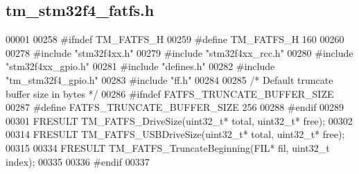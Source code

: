 \hypertarget{tm__stm32f4__fatfs_8h_source}{}\subsection{tm\+\_\+stm32f4\+\_\+fatfs.\+h}

\begin{DoxyCode}
00001 
00258 \textcolor{preprocessor}{#ifndef TM\_FATFS\_H}
00259 \textcolor{preprocessor}{#define TM\_FATFS\_H  160}
00260 
00278 \textcolor{preprocessor}{#include "stm32f4xx.h"}
00279 \textcolor{preprocessor}{#include "stm32f4xx\_rcc.h"}
00280 \textcolor{preprocessor}{#include "stm32f4xx\_gpio.h"}
00281 \textcolor{preprocessor}{#include "defines.h"}
00282 \textcolor{preprocessor}{#include "tm\_stm32f4\_gpio.h"}
00283 \textcolor{preprocessor}{#include "ff.h"}
00284 
00285 \textcolor{comment}{/* Default truncate buffer size in bytes */}
00286 \textcolor{preprocessor}{#ifndef FATFS\_TRUNCATE\_BUFFER\_SIZE}
00287 \textcolor{preprocessor}{#define FATFS\_TRUNCATE\_BUFFER\_SIZE  256}
00288 \textcolor{preprocessor}{#endif}
00289 
00301 FRESULT TM\_FATFS\_DriveSize(uint32\_t* total, uint32\_t* free);
00302 
00314 FRESULT TM\_FATFS\_USBDriveSize(uint32\_t* total, uint32\_t* free);
00315 
00334 FRESULT TM\_FATFS\_TruncateBeginning(FIL* fil, uint32\_t index);
00335 
00336 \textcolor{preprocessor}{#endif}
00337 
\end{DoxyCode}

